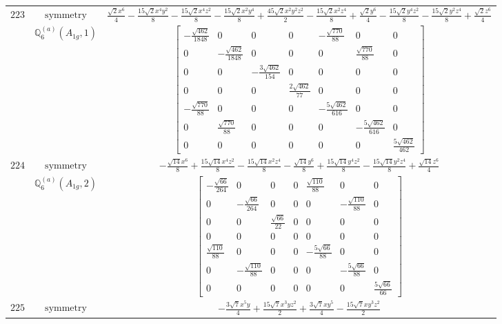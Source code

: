 \documentclass[fleqn,8pt,landscape]{jsarticle}
\begin{document}
\begin{longtable}{ccc}
$ 223 $ & $ \text{symmetry} $ & $ \frac{\sqrt{2} x^{6}}{4} - \frac{15 \sqrt{2} x^{4} y^{2}}{8} - \frac{15 \sqrt{2} x^{4} z^{2}}{8} - \frac{15 \sqrt{2} x^{2} y^{4}}{8} + \frac{45 \sqrt{2} x^{2} y^{2} z^{2}}{2} - \frac{15 \sqrt{2} x^{2} z^{4}}{8} + \frac{\sqrt{2} y^{6}}{4} - \frac{15 \sqrt{2} y^{4} z^{2}}{8} - \frac{15 \sqrt{2} y^{2} z^{4}}{8} + \frac{\sqrt{2} z^{6}}{4} $ \\
$  $ & $ \mathbb{Q}_{6}^{(a)}(A_{1g},1) $ & $ \begin{bmatrix} - \frac{\sqrt{462}}{1848} & 0 & 0 & 0 & - \frac{\sqrt{770}}{88} & 0 & 0 \\ 0 & - \frac{\sqrt{462}}{1848} & 0 & 0 & 0 & \frac{\sqrt{770}}{88} & 0 \\ 0 & 0 & - \frac{3 \sqrt{462}}{154} & 0 & 0 & 0 & 0 \\ 0 & 0 & 0 & \frac{2 \sqrt{462}}{77} & 0 & 0 & 0 \\ - \frac{\sqrt{770}}{88} & 0 & 0 & 0 & - \frac{5 \sqrt{462}}{616} & 0 & 0 \\ 0 & \frac{\sqrt{770}}{88} & 0 & 0 & 0 & - \frac{5 \sqrt{462}}{616} & 0 \\ 0 & 0 & 0 & 0 & 0 & 0 & \frac{5 \sqrt{462}}{462} \end{bmatrix} $ \\ \hline
$ 224 $ & $ \text{symmetry} $ & $ - \frac{\sqrt{14} x^{6}}{8} + \frac{15 \sqrt{14} x^{4} z^{2}}{8} - \frac{15 \sqrt{14} x^{2} z^{4}}{8} - \frac{\sqrt{14} y^{6}}{8} + \frac{15 \sqrt{14} y^{4} z^{2}}{8} - \frac{15 \sqrt{14} y^{2} z^{4}}{8} + \frac{\sqrt{14} z^{6}}{4} $ \\
$  $ & $ \mathbb{Q}_{6}^{(a)}(A_{1g},2) $ & $ \begin{bmatrix} - \frac{\sqrt{66}}{264} & 0 & 0 & 0 & \frac{\sqrt{110}}{88} & 0 & 0 \\ 0 & - \frac{\sqrt{66}}{264} & 0 & 0 & 0 & - \frac{\sqrt{110}}{88} & 0 \\ 0 & 0 & \frac{\sqrt{66}}{22} & 0 & 0 & 0 & 0 \\ 0 & 0 & 0 & 0 & 0 & 0 & 0 \\ \frac{\sqrt{110}}{88} & 0 & 0 & 0 & - \frac{5 \sqrt{66}}{88} & 0 & 0 \\ 0 & - \frac{\sqrt{110}}{88} & 0 & 0 & 0 & - \frac{5 \sqrt{66}}{88} & 0 \\ 0 & 0 & 0 & 0 & 0 & 0 & \frac{5 \sqrt{66}}{66} \end{bmatrix} $ \\ \hline
$ 225 $ & $ \text{symmetry} $ & $ - \frac{3 \sqrt{7} x^{5} y}{4} + \frac{15 \sqrt{7} x^{3} y z^{2}}{2} + \frac{3 \sqrt{7} x y^{5}}{4} - \frac{15 \sqrt{7} x y^{3} z^{2}}{2} $ \\

\end{longtable}
\end{document}
